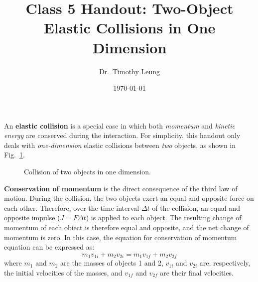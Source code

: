 \documentclass{../../oss-handout}
\title{Class 5 Handout: Two-Object Elastic Collisions in One Dimension}
\author{Dr.\ Timothy Leung}
\date{\today}
\begin{document}
\thispagestyle{title}

\gentitle

An \textbf{elastic collision} is a special case in which both \emph{momentum}
and \emph{kinetic energy} are conserved during the interaction. For simplicity,
this handout only deals with \emph{one-dimension} elastic collisions between
\emph{two} objects, as shown in Fig.~\ref{fig:1d}.
\begin{figure}[ht]
  \centering
  \caption{Collision of two objects in one dimension.}
  \label{fig:1d}
\end{figure}

\textbf{Conservation of momentum} is the direct consequence of the third law of
motion. During the collision, the two objects exert an equal and opposite force
on each other. Therefore, over the time interval $\Delta t$ of the collision,
an equal and opposite impulse ($J=F\Delta t$) is applied to each object. The
resulting change of momentum of each obiect is therefore equal and opposite,
and the net change of momentum is zero. In this case, the equation for
conservation of momentum equation can be expressed as:
\begin{equation}
  m_1v_{1i}+m_2v_{2i}=m_1v_{1f}+m_2v_{2f}
  \label{eq:mom1}
\end{equation}
where $m_1$ and $m_2$ are the masses of objects 1 and 2, $v_{1i}$ and $v_{2i}$
are, respectively, the initial velocities of the masses, and $v_{1f}$ and
$v_{2f}$ are their final velocities.
\end{document}
